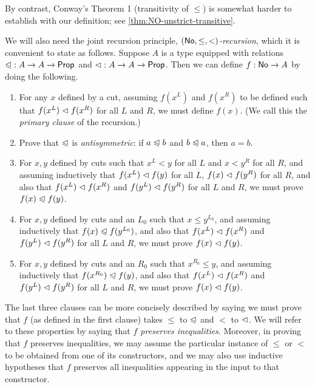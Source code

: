By contrast, Conway's Theorem 1 (transitivity of $\le$) is somewhat harder to establish with our definition; see \autoref{thm:NO-unstrict-transitive}.



We will also need the joint recursion principle, \emph{$(\mathsf{No},\le,<)$-recursion}, which it is convenient to state as follows.
Suppose $A$ is a type equipped with relations $\mathord{\trianglelefteqslant}:A\to A\to\mathsf{Prop}$ and $\mathord{\vartriangleleft}:A\to A\to\mathsf{Prop}$.
Then we can define $f:\mathsf{No}\to A$ by doing the following.
\begin{enumerate}
\item For any $x$ defined by a cut, assuming $f(x^L)$ and $f(x^R)$ to be defined such that $f(x^L)\vartriangleleft f(x^R)$ for all $L$ and $R$, we must define $f(x)$.  (We call this the \emph{primary clause} of the recursion.)\label{item:NO-rec-primary}
\item Prove that $\trianglelefteqslant$ is \emph{antisymmetric}: if $a\trianglelefteqslant b$ and $b\trianglelefteqslant a$, then $a=b$.
\item For $x,y$ defined by cuts such that $x^L<y$ for all $L$ and $x<y^R$ for all $R$, and assuming inductively that $f(x^L)\vartriangleleft f(y)$ for all $L$, $f(x)\vartriangleleft f(y^R)$ for all $R$, and also that $f(x^L)\vartriangleleft f(x^R)$ and $f(y^L)\vartriangleleft f(y^R)$ for all $L$ and $R$, we must prove $f(x)\trianglelefteqslant f(y)$.
\item For $x,y$ defined by cuts and an $L_0$ such that $x\le y^{L_0}$, and assuming inductively that $f(x)\trianglelefteqslant f(y^{L_0})$, and also that $f(x^L)\vartriangleleft f(x^R)$ and $f(y^L)\vartriangleleft f(y^R)$ for all $L$ and $R$, we must prove $f(x)\vartriangleleft f(y)$.
\item For $x,y$ defined by cuts and an $R_0$ such that $x^{R_0}\le y$, and assuming inductively that $f(x^{R_0})\trianglelefteqslant f(y)$, and also that $f(x^L)\vartriangleleft f(x^R)$ and $f(y^L)\vartriangleleft f(y^R)$ for all $L$ and $R$, we must prove $f(x)\vartriangleleft f(y)$.\label{item:NO-rec-last}
\end{enumerate}
The last three clauses can be more concisely described by saying we must prove that $f$ (as defined in the first clause) takes $\le$ to $\trianglelefteqslant$ and $<$ to $\vartriangleleft$.
We will refer to these properties by saying that \emph{$f$ preserves inequalities}.
Moreover, in proving that $f$ preserves inequalities, we may assume the particular instance of $\le$ or $<$ to be obtained from one of its constructors, and we may also use inductive hypotheses that $f$ preserves all inequalities appearing in the input to that constructor.

